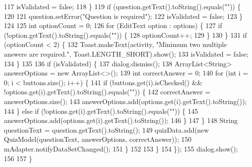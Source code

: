 \begin{DoxyCode}
117                     isValidated = \textcolor{keyword}{false};
118                 \}
119                 \textcolor{keywordflow}{if} (question.getText().toString().equals(\textcolor{stringliteral}{""})) \{
120 
121                     question.setError(\textcolor{stringliteral}{"Question is required"});
122                     isValidated = \textcolor{keyword}{false};
123                 \}
124 
125                 \textcolor{keywordtype}{int} optionCount = 0;
126                 \textcolor{keywordflow}{for} (EditText option : options) \{
127                     \textcolor{keywordflow}{if} (!option.getText().toString().equals(\textcolor{stringliteral}{""})) \{
128                         optionCount++;
129                     \}
130                 \}
131                 \textcolor{keywordflow}{if} (optionCount < 2) \{
132                     Toast.makeText(activity, \textcolor{stringliteral}{"Minimum two multiple answers are required."}, 
      Toast.LENGTH\_SHORT).show();
133                     isValidated = \textcolor{keyword}{false};
134                 \}
135 
136                 \textcolor{keywordflow}{if} (isValidated) \{
137                     dialog.dismiss();
138                     ArrayList<String> answerOptions = \textcolor{keyword}{new} ArrayList<>();
139                     \textcolor{keywordtype}{int} correctAnswer = 0;
140                     \textcolor{keywordflow}{for} (\textcolor{keywordtype}{int} i = 0; i < buttons.size(); i++) \{
141                         \textcolor{keywordflow}{if} (buttons.get(i).isChecked() && !options.get(i).getText().toString().equals(\textcolor{stringliteral}{""})) 
      \{
142                             correctAnswer = answerOptions.size();
143                             answerOptions.add(options.get(i).getText().toString());
144                         \} \textcolor{keywordflow}{else} \textcolor{keywordflow}{if} (!options.get(i).getText().toString().equals(\textcolor{stringliteral}{""})) \{
145                             answerOptions.add(options.get(i).getText().toString());
146                         \}
147                     \}
148                     String questionText = question.getText().toString();
149                     quizData.add(\textcolor{keyword}{new} QuizModel(questionText, answerOptions, correctAnswer));
150                     mAdapter.notifyDataSetChanged();
151                 \}
152 
153             \}
154         \});
155         dialog.show();
156 
157     \}
\end{DoxyCode}
